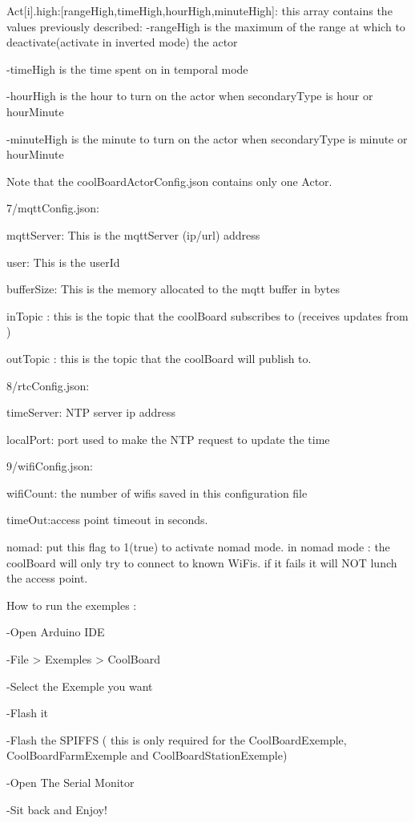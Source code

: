 \begin{DoxyVerb}
Act[i].high:[rangeHigh,timeHigh,hourHigh,minuteHigh]: this array contains the values previously described:
                                                  -rangeHigh is the maximum of the range at which 
                                                  to deactivate(activate in inverted mode) the actor

                                                  -timeHigh is the time spent on in temporal mode

                                                  -hourHigh is the hour to turn on the actor when secondaryType is hour or hourMinute

                                                  -minuteHigh is the minute to turn on the actor when secondaryType is minute or hourMinute


   Note that the coolBoardActorConfig.json contains only one Actor.
\end{DoxyVerb}


7/mqtt\+Config.\+json\+:

mqtt\+Server\+: This is the mqtt\+Server (ip/url) address

user\+: This is the user\+Id

buffer\+Size\+: This is the memory allocated to the mqtt buffer in bytes

in\+Topic \+: this is the topic that the cool\+Board subscribes to (receives updates from )

out\+Topic \+: this is the topic that the cool\+Board will publish to.

8/rtc\+Config.\+json\+:

time\+Server\+: N\+TP server ip address

local\+Port\+: port used to make the N\+TP request to update the time

9/wifi\+Config.\+json\+:

wifi\+Count\+: the number of wifis saved in this configuration file

time\+Out\+:access point timeout in seconds.

nomad\+: put this flag to 1(true) to activate nomad mode. in nomad mode \+: the cool\+Board will only try to connect to known Wi\+Fis. if it fails it will N\+OT lunch the access point.

How to run the exemples \+: \begin{DoxyVerb}-Open Arduino IDE 

-File > Exemples > CoolBoard

-Select the Exemple you want

-Flash it

-Flash the SPIFFS ( this is only required for the CoolBoardExemple, CoolBoardFarmExemple and CoolBoardStationExemple)

-Open The Serial Monitor

-Sit back and Enjoy!
\end{DoxyVerb}



